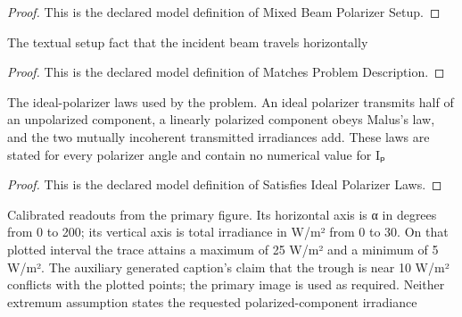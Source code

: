 \begin{proof}
  This is the declared model definition of Mixed Beam Polarizer Setup.
\end{proof}
\begin{definition}
  \label{def:physics:phyx-mini-0105:phyxminiproblems-problemphyxmini0105-matchesproblemdescription}
  The textual setup fact that the incident beam travels horizontally
\end{definition}
\begin{proof}
  This is the declared model definition of Matches Problem Description.
\end{proof}
\begin{definition}
  \label{def:physics:phyx-mini-0105:phyxminiproblems-problemphyxmini0105-satisfiesidealpolarizerlaws}
  The ideal-polarizer laws used by the problem. An ideal polarizer transmits half of an unpolarized component, a linearly polarized component obeys Malus's law, and the two mutually incoherent transmitted irradiances add. These laws are stated for every polarizer angle and contain no numerical value for Iₚ
\end{definition}
\begin{proof}
  This is the declared model definition of Satisfies Ideal Polarizer Laws.
\end{proof}
\begin{definition}
  \label{def:physics:phyx-mini-0105:phyxminiproblems-problemphyxmini0105-matchesintensitygraph}
  Calibrated readouts from the primary figure. Its horizontal axis is α in degrees from 0 to 200; its vertical axis is total irradiance in W/m² from 0 to 30. On that plotted interval the trace attains a maximum of 25 W/m² and a minimum of 5 W/m². The auxiliary generated caption's claim that the trough is near 10 W/m² conflicts with the plotted points; the primary image is used as required. Neither extremum assumption states the requested polarized-component irradiance
\end{definition}
